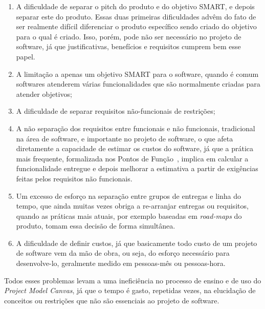 \documentclass[a4]{report}
\begin{document}
\begin{enumerate}
    \item A dificuldade de separar o pitch do produto e do objetivo SMART, e depois separar este do produto. Essas duas primeiras dificuldades advêm do fato de ser realmente difícil diferenciar o produto específico sendo criado do objetivo para o qual é criado. Isso, porém, pode não ser necessário no projeto de software, já que justificativas, benefícios e requisitos cumprem bem esse papel.
    \item A limitação a apenas um objetivo SMART para o software, quando é comum softwares atenderem várias funcionalidades que são normalmente criadas para atender objetivos;
    \item A dificuldade de separar requisitos não-funcionais de restrições;
    \item A não separação dos requisitos entre funcionais e não funcionais, tradicional na área de software, e importante no projeto de software, o que afeta diretamente a capacidade de estimar os custos do software, já que a prática mais frequente, formalizada nos Pontos de Função~\citep{ifpug:guide:2012}, implica em calcular a funcionalidade entregue e depois melhorar a estimativa a partir de exigências feitas pelos requisitos não funcionais.
    \item Um excesso de esforço na separação entre grupos de entregas e linha do tempo, que ainda muitas vezes obriga a re-arranjar entregas ou requisitos, quando as práticas mais atuais, por exemplo baseadas em \textit{road-maps} do produto, tomam essa decisão de forma simultânea.
    \item \label{problems:total} A dificuldade de definir custos, já que basicamente todo custo de um projeto de software vem da mão de obra, ou seja, do esforço necessário para desenvolve-lo, geralmente medido em pessoas-mês ou pessoas-hora.
\end{enumerate}

Todos esses problemas levam a uma ineficiência no processo de ensino e de uso do \textit{Project Model Canvas}, já que o tempo é gasto, repetidas vezes, na elucidação de conceitos ou restrições que não são essenciais ao projeto de software.
\end{document}
